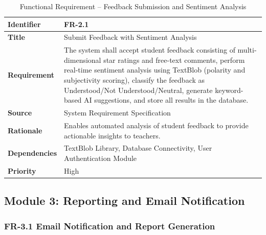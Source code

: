 \begin{table}[H]
\centering
\caption{Functional Requirement -- Feedback Submission and Sentiment Analysis}

\begin{tabularx}{\textwidth}{|p{3cm}|X|}
\hline
\textbf{Identifier} & FR-2.1 \\
\hline
\textbf{Title} & Submit Feedback with Sentiment Analysis \\
\hline
\textbf{Requirement} & The system shall accept student feedback consisting of multi-dimensional star ratings and free-text comments, perform real-time sentiment analysis using TextBlob (polarity and subjectivity scoring), classify the feedback as Understood/Not Understood/Neutral, generate keyword-based AI suggestions, and store all results in the database. \\
\hline
\textbf{Source} & System Requirement Specification \\
\hline
\textbf{Rationale} & Enables automated analysis of student feedback to provide actionable insights to teachers. \\
\hline
\textbf{Dependencies} & TextBlob Library, Database Connectivity, User Authentication Module \\
\hline
\textbf{Priority} & High \\
\hline
\end{tabularx}

\end{table}



\subsection{Module 3: Reporting and Email Notification}

\subsubsection{FR-3.1 Email Notification and Report Generation}

